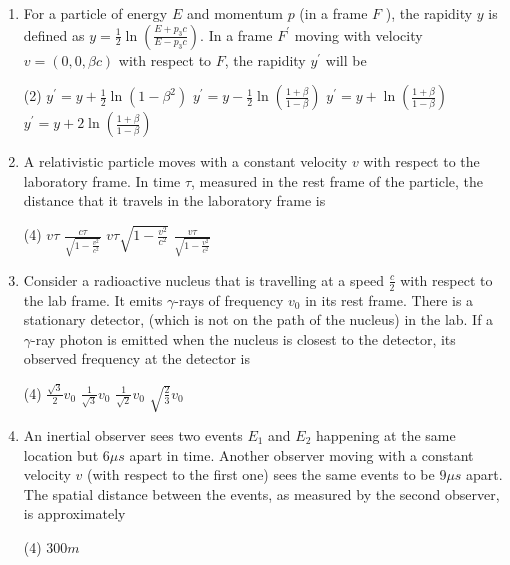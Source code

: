 \begin{enumerate}
	\item For a particle of energy $E$ and momentum $p$ (in a frame $F$ ), the rapidity $y$ is defined as $y=\frac{1}{2} \ln \left(\frac{E+p_{3} c}{E-p_{3} c}\right) .$ In a frame $F^{\prime}$ moving with velocity $v=(0,0, \beta c)$ with respect to $F$, the rapidity $y^{\prime}$ will be
	{}
\begin{tasks}(2)
	\task[\textbf{A.}] $y^{\prime}=y+\frac{1}{2} \ln \left(1-\beta^{2}\right)$
	\task[\textbf{B.}]$y^{\prime}=y-\frac{1}{2} \ln \left(\frac{1+\beta}{1-\beta}\right)$
	\task[\textbf{C.}]$y^{\prime}=y+\ln \left(\frac{1+\beta}{1-\beta}\right)$
	\task[\textbf{D.}]$y^{\prime}=y+2 \ln \left(\frac{1+\beta}{1-\beta}\right)$
\end{tasks}
	\item A relativistic particle moves with a constant velocity $v$ with respect to the laboratory frame. In time $\tau$, measured in the rest frame of the particle, the distance that it travels in the laboratory frame is
	{}
\begin{tasks}(4)
	\task[\textbf{A.}] $v \tau$
	\task[\textbf{B.}]$\frac{c \tau}{\sqrt{1-\frac{v^{2}}{c^{2}}}}$
	\task[\textbf{C.}]$v \tau \sqrt{1-\frac{v^{2}}{c^{2}}}$
	\task[\textbf{D.}]$\frac{v \tau}{\sqrt{1-\frac{v^{2}}{c^{2}}}}$
\end{tasks}
	\item Consider a radioactive nucleus that is travelling at a speed $\frac{c}{2}$ with respect to the lab frame. It emits $\gamma$-rays of frequency $v_{0}$ in its rest frame. There is a stationary detector, (which is not on the path of the nucleus) in the lab. If a $\gamma$-ray photon is emitted when the nucleus is closest to the detector, its observed frequency at the detector is
	{}
\begin{tasks}(4)
	\task[\textbf{A.}] $\frac{\sqrt{3}}{2} v_{0}$
	\task[\textbf{B.}]$\frac{1}{\sqrt{3}} v_{0}$
	\task[\textbf{C.}]$\frac{1}{\sqrt{2}} v_{0}$
	\task[\textbf{D.}]$\sqrt{\frac{2}{3}} v_{0}$
\end{tasks}
	\item An inertial observer sees two events $E_{1}$ and $E_{2}$ happening at the same location but $6 \mu s$ apart in time. Another observer moving with a constant velocity $v$ (with respect to the first one) sees the same events to be $9 \mu s$ apart. The spatial distance between the events, as measured by the second observer, is approximately
{	}
\begin{tasks}(4)
	\task[\textbf{A.}] $300 m$

\end{tasks}
\end{enumerate}
